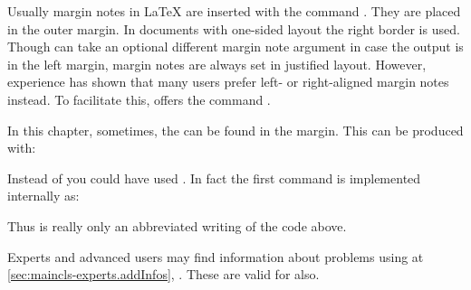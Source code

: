 \begin{Declaration}
\end{Declaration}%
Usually margin notes in {\LaTeX} are
inserted with the command . They are placed in the
outer margin.  In documents with one-sided layout the right border is
used. Though  can take an optional different margin
note argument in case the output is in the left margin, margin notes
are always set in justified layout.  However, experience has shown
that many users prefer left- or right-aligned margin notes instead.
To facilitate this, {\KOMAScript} offers the command
.
\ifCommonscrlttr\else
\begin{Example}
  \label{desc:\csname
    label@base\endcsname.cmd.marginline.example}%
  In this chapter, sometimes, the 
  can be found in the margin. This can be produced with:%
\iffalse%
  \footnote{In fact, instead of
    \Macro{texttt}, a semantic highlighting was used. To avoid
    confusion this was replaced in the example.}
\fi
\ifCommonmaincls
\begin{lstcode}
\end{lstcode}
\else
\begin{lstcode}
\end{lstcode}
\fi

  Instead of  you could have used . In fact
  the first command is implemented internally as:
\ifCommonmaincls
\begin{lstcode}
\end{lstcode}
\else
\begin{lstcode}
\end{lstcode}
\fi
  Thus  is really only an abbreviated writing of the
  code above.%
\end{Example}%

Experts and advanced users may find information about
problems using  at \autoref{sec:maincls-experts.addInfos},
. These are valid for
 also.%
\fi%
%
%
\EndIndexGroup
%
\fi %
%
\EndIndexGroup

